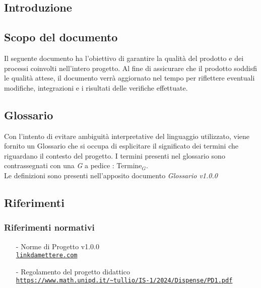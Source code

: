 \documentclass[11pt]{article}
\begin{document}
\begin{justify}


\section{Introduzione}


\subsection{Scopo del documento}

Il seguente documento ha l'obiettivo di garantire la qualità del prodotto e dei processi coinvolti nell'intero progetto. Al fine di assicurare che il prodotto soddisfi le qualità attese, il documento
verrà aggiornato nel tempo per riflettere eventuali modifiche, integrazioni e i risultati delle verifiche effettuate.


\subsection{Glossario}
Con l'intento di evitare ambiguità interpretative del linguaggio utilizzato, viene fornito un Glossario che si occupa di esplicitare il significato dei termini che riguardano il contesto del progetto. I termini presenti nel glossario sono contrassegnati con una \textit{G} a pedice : Termine\(_G\).\\
Le definizioni sono presenti nell'apposito documento \textit{Glossario v1.0.0}


\subsection{Riferimenti}


\subsubsection{Riferimenti normativi}
\begin{itemize}
    \item[-] Norme di Progetto v1.0.0\\
    \textcolor{blue}{\texttt{\url{linkdamettere.com}}}

    \item[-] Regolamento del progetto didattico  \\
    \textcolor{blue}{\texttt{\url{https://www.math.unipd.it/~tullio/IS-1/2024/Dispense/PD1.pdf}}}

\end{itemize}

\end{justify}
\end{document}
